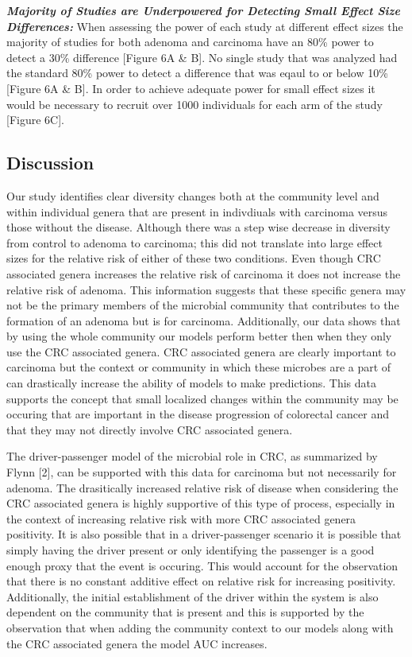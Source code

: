 \documentclass[12pt,]{article}
\begin{document}
\textbf{\emph{Majority of Studies are Underpowered for Detecting Small
Effect Size Differences:}} When assessing the power of each study at
different effect sizes the majority of studies for both adenoma and
carcinoma have an 80\% power to detect a 30\% difference {[}Figure 6A \&
B{]}. No single study that was analyzed had the standard 80\% power to
detect a difference that was eqaul to or below 10\% {[}Figure 6A \&
B{]}. In order to achieve adequate power for small effect sizes it would
be necessary to recruit over 1000 individuals for each arm of the study
{[}Figure 6C{]}.

\newpage

\subsection{Discussion}\label{discussion}

Our study identifies clear diversity changes both at the community level
and within individual genera that are present in indivdiuals with
carcinoma versus those without the disease. Although there was a step
wise decrease in diversity from control to adenoma to carcinoma; this
did not translate into large effect sizes for the relative risk of
either of these two conditions. Even though CRC associated genera
increases the relative risk of carcinoma it does not increase the
relative risk of adenoma. This information suggests that these specific
genera may not be the primary members of the microbial community that
contributes to the formation of an adenoma but is for carcinoma.
Additionally, our data shows that by using the whole community our
models perform better then when they only use the CRC associated genera.
CRC associated genera are clearly important to carcinoma but the context
or community in which these microbes are a part of can drastically
increase the ability of models to make predictions. This data supports
the concept that small localized changes within the community may be
occuring that are important in the disease progression of colorectal
cancer and that they may not directly involve CRC associated genera.

The driver-passenger model of the microbial role in CRC, as summarized
by Flynn {[}2{]}, can be supported with this data for carcinoma but not
necessarily for adenoma. The drasitically increased relative risk of
disease when considering the CRC associated genera is highly supportive
of this type of process, especially in the context of increasing
relative risk with more CRC associated genera positivity. It is also
possible that in a driver-passenger scenario it is possible that simply
having the driver present or only identifying the passenger is a good
enough proxy that the event is occuring. This would account for the
observation that there is no constant additive effect on relative risk
for increasing positivity. Additionally, the initial establishment of
the driver within the system is also dependent on the community that is
present and this is supported by the observation that when adding the
community context to our models along with the CRC associated genera the
model AUC increases.
\end{document}
